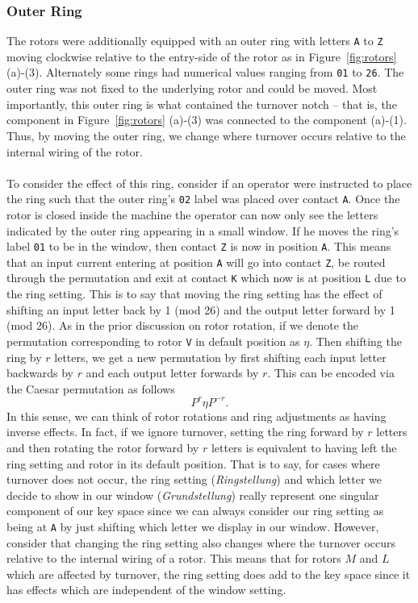 \subsubsection{Outer Ring}

The rotors were additionally equipped with an outer ring with
letters \texttt{A} to \texttt{Z} moving clockwise relative to the
entry-side of the rotor as in Figure~\ref{fig:rotors} (a)-(3).
Alternately some rings had numerical values
ranging from \texttt{01} to \texttt{26}. The outer ring was not fixed
to the underlying rotor and could be moved. Most importantly, this
outer ring is what contained the turnover notch -- that is, the
component in Figure~\ref{fig:rotors} (a)-(3) was connected to the
component (a)-(1). Thus, by moving the outer ring, we change where
turnover occurs relative to the internal wiring of the rotor.
\\\\To consider the effect of this ring,
consider if an operator were instructed to place the ring such that
the outer ring's \texttt{02} label was placed over contact \texttt{A}. Once
the rotor is closed inside the machine
the operator can now only see the letters indicated by the outer ring
appearing in a small window. If he moves the ring's label \texttt{01}
to be in the window, then contact \texttt{Z} is now in position
\texttt{A}. This means that an input current
entering at position \texttt{A} will go into contact \texttt{Z}, be
routed through the permutation and exit
at contact \texttt{K} which now is at position \texttt{L} due to the
ring setting. This is to say that moving the ring
setting has the effect of shifting an input letter back by 1 (mod 26)
and the output letter forward by 1 (mod 26).
As in the prior discussion on rotor rotation, if we denote the
permutation corresponding to rotor \texttt{V} in default position as
$\eta$. Then shifting the ring by $r$ letters, we get a new
permutation by first shifting each input letter backwards by $r$ and
each output letter forwards by $r$. This can be encoded via the
Caesar permutation as follows
\[
  {P^{r}}\eta{P^{-r}}.
\]
In this sense, we can think of rotor rotations and ring adjustments
as having inverse effects. In fact, if we ignore turnover, setting
the ring forward by $r$ letters and then rotating the rotor forward by $r$
letters is equivalent to having left the ring setting and rotor in
its default position. That is to say, for cases where turnover does
not occur, the ring setting (\emph{Ringstellung}) and which letter
we decide to show in our window (\emph{Grundstellung}) really
represent one singular component of our key space since we can always
consider our ring setting as being at \texttt{A} by just shifting
which letter we display in our window.
However, consider that changing the ring
setting also changes where the turnover occurs relative to the
internal wiring of a rotor. This means that for rotors $M$ and $L$
which are affected by turnover, the ring setting does add to
the key space since it has effects which are independent of the
window setting.

